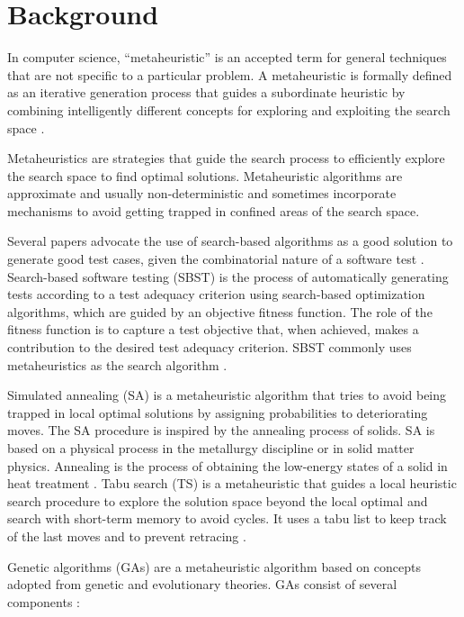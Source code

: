\documentclass{bmcart}
\begin{document}
\section{Background}

In computer science, ``metaheuristic'' is an accepted term for general techniques that are not specific to a particular problem. A metaheuristic is formally defined as an iterative generation process that guides a subordinate heuristic by combining intelligently different concepts for exploring and exploiting the search space \citep{raidl2010metaheuristic}. 

Metaheuristics are strategies that guide the search process to efficiently explore the search space to find optimal solutions. Metaheuristic algorithms are approximate and usually non-deterministic and sometimes incorporate mechanisms to avoid getting trapped in confined areas of the search space. 


Several papers advocate the use of search-based algorithms as a good solution to generate good test cases, given the combinatorial nature of a software test \citep{pargas1999test} \citep{berndt2004investigating} \citep{baudry2005automatic} \citep{baudry2002genes} \citep{watkins2004breeding} \citep{perumal2011test} \citep{berndt2005high}. Search-based software testing (SBST) is the process of automatically generating tests according to a test adequacy criterion using search-based optimization algorithms, which are guided by an objective fitness function. The role of the fitness function is to capture a test objective that, when achieved, makes a contribution to the desired test adequacy criterion. SBST commonly uses metaheuristics as the search algorithm \citep{Harman2010}.

Simulated annealing (SA) is a metaheuristic algorithm that tries to avoid being trapped in local optimal solutions by assigning probabilities to deteriorating moves. The SA procedure is inspired by the annealing process of solids. SA is based on a physical
process in the metallurgy discipline or in solid matter physics. Annealing is the process of obtaining the low-energy states of a solid in heat treatment \citep{Jaziri2008}. Tabu search (TS) is a metaheuristic that guides a local heuristic search procedure to explore the solution space beyond the local optimal and search with short-term memory to avoid cycles. It uses a tabu list to keep track of the last  moves and to prevent retracing \citep{Glover1986}.

Genetic algorithms (GAs) are a metaheuristic algorithm based on concepts adopted from genetic and evolutionary theories. GAs consist of several components \citep{hong2000simultaneously} \citep{shousha2003performance}:
\end{document}

